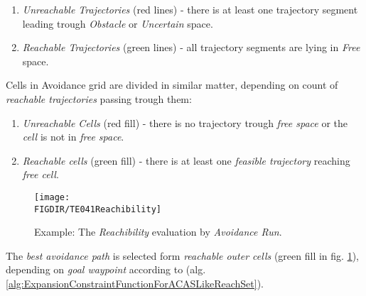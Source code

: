 \begin{enumerate}
    \item \emph{Unreachable Trajectories} (red lines) - there is at least one trajectory segment leading trough \emph{Obstacle} or \emph{Uncertain} space.
    
    \item \emph{Reachable Trajectories} (green lines) -  all trajectory segments are lying in \emph{Free} space.
\end{enumerate}

Cells in Avoidance grid are divided in similar matter, depending on count of \emph{reachable trajectories} passing trough them:

\begin{enumerate}
    \item \emph{Unreachable Cells} (red fill) - there is no trajectory trough \emph{free space} or the \emph{cell} is not in \emph{free space}.
    
    \item \emph{Reachable cells} (green fill) - there is at least one \emph{feasible trajectory} reaching \emph{free cell}.
\end{enumerate}

\begin{figure}[H]
    \centering
    \texttt{[image: \\FIGDIR/TE041Reachibility]}        
    \caption{Example: The \emph{Reachibility} evaluation by \emph{Avoidance Run}.}
    \label{fig:exampleReachibilityEvaluation}
\end{figure}

\begin{note}
    The \emph{best avoidance path} is selected form \emph{reachable outer cells} (green fill in fig. \ref{fig:exampleReachibilityEvaluation}), depending on \emph{goal waypoint} according to (alg. \ref{alg:ExpansionConstraintFunctionForACASLikeReachSet}).
\end{note}